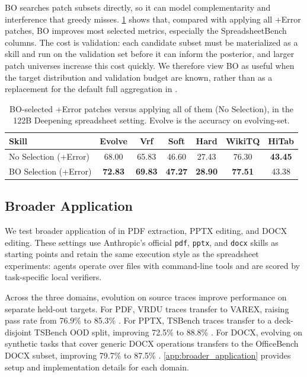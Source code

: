 BO searches patch subsets directly, so it can model complementarity and interference that greedy misses.
\cref{tab:bo_patch_selection} shows that, compared with applying all +Error patches, BO improves most selected metrics, especially the SpreadsheetBench columns.
The cost is validation: each candidate subset must be materialized as a skill and run on the validation set before it can inform the posterior, and larger patch universes increase this cost quickly.
We therefore view BO as useful when the target distribution and validation budget are known, rather than as a replacement for the default full aggregation in \systemname{}.

\begin{table}[t]
\centering
\setlength{\tabcolsep}{5pt}
\caption{BO-selected +Error patches versus applying all of them (No Selection), in the 122B Deepening spreadsheet setting. Evolve is the accuracy on evolving-set.}
\begin{tabular}{lcccccc}
\toprule
\textbf{Skill} & \textbf{Evolve} & \textbf{Vrf} & \textbf{Soft} & \textbf{Hard} & \textbf{WikiTQ} & \textbf{HiTab} \\
\midrule
No Selection (+Error) & 68.00 & 65.83 & 46.60 & 27.43 & 76.30 & \textbf{43.45} \\
BO Selection (+Error) & \textbf{72.83} & \textbf{69.83} & \textbf{47.27} & \textbf{28.90} & \textbf{77.51} & 43.38 \\
\bottomrule
\end{tabular}

\label{tab:bo_patch_selection}
\end{table}

\subsection{Broader Application}
\label{sec:analysis:broader_application}
We test broader application of \systemname{} in PDF extraction, PPTX editing, and DOCX editing. These settings use Anthropic's official \texttt{pdf}, \texttt{pptx}, and \texttt{docx} skills as starting points \citep{anthropic2026documentskills} and retain the same execution style as the spreadsheet experiments: agents operate over files with command-line tools and are scored by task-specific local verifiers.

Across the three domains, evolution on source traces improve performance on separate held-out targets. For PDF, VRDU traces transfer to VAREX, raising pass rate from 76.9\% to 85.3\% \citep{wang2023vrdu,barzelay2026varex}. For PPTX, TSBench traces transfer to a deck-disjoint TSBench OOD split, improving 72.5\% to 88.8\% \citep{jung2026talktoyourslides}. For DOCX, evolving on synthetic tasks that cover generic DOCX operations transfers to the OfficeBench DOCX subset, improving 79.7\% to 87.5\% \citep{wang2024officebench}. \cref{app:broader_application} provides setup and implementation details for each domain.

